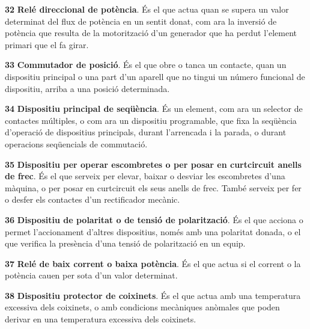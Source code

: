 \begin{multicols}{2}
\begin{list}{}
\item[\textbf{32}]  
\textbf{Relé direccional de potència}. És el que actua quan se supera un valor determinat del
flux de potència en un sentit donat, com ara la inversió de potència que resulta de la motorització d'un generador que ha perdut l'element primari que el fa girar.

\item[\textbf{33}]  
\textbf{Commutador de posició}. És el que
obre o tanca un contacte, quan un dispositiu principal o una part d'un aparell que no tingui un número funcional de dispositiu, arriba a una posició determinada.

\item[\textbf{34}]  
\textbf{Dispositiu principal de  seqüència}. És un element, com ara un selector de contactes múltiples, o com ara un
 dispositiu programable,
 que fixa la seqüència d'operació
de dispositius principals, durant l'arrencada i la parada, o durant  operacions seqüencials de commutació.


\item[\textbf{35}]   
\textbf{Dispositiu per operar escombretes o per posar en curtcircuit anells de frec}. És el que serveix per elevar, baixar o
desviar les escombretes d'una màquina, o per posar en curtcircuit
els seus anells de frec. També serveix per fer o desfer els
contactes d'un rectificador mecànic.

\item[\textbf{36}] 
 
\textbf{Dispositiu de polaritat o de tensió de polarització}. És el que acciona o permet
l'accionament d'altres dispositius, només amb una polaritat
donada, o el que verifica la presència d'una tensió de polarització
en un equip.

\item[\textbf{37}] 
 \textbf{Relé de baix corrent o baixa potència}. És el que actua si el corrent o la potència cauen per
sota d'un valor determinat.

\item[\textbf{38}] 
\textbf{Dispositiu protector de coixinets}. És el que actua amb una
temperatura excessiva dels coixinets, o amb condicions mecàniques
anòmales que poden derivar en una temperatura excessiva dels
coixinets.


\end{list}
\end{multicols}
